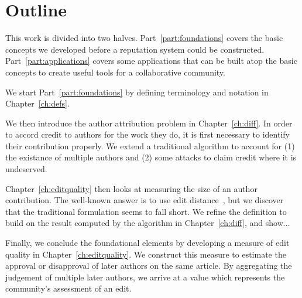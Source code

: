 \section{Outline}

This work is divided into two halves.
Part~\ref{part:foundations} covers the basic concepts we developed
before a reputation system could be constructed.
Part~\ref{part:applications} covers some applications that can
be built atop the basic concepts to create useful tools for
a collaborative community.

We start Part~\ref{part:foundations}
by defining terminology and notation in Chapter~\ref{ch:defs}.

We then introduce the author attribution problem in Chapter~\ref{ch:diff}.
In order to accord credit to authors for the work they do,
it is first necessary to identify their contribution properly.
We extend a traditional  algorithm to
account for (1) the existance of multiple authors and (2) some attacks
to claim credit where it is undeserved.

Chapter~\ref{ch:editquality} then looks at measuring the size of
an author contribution.
The well-known answer is to use edit distance~\cite{Levenshtein66},
but we discover that the traditional formulation seems to fall short.
We refine the definition to build on the result computed by the
algorithm in Chapter~\ref{ch:diff}, and show...

Finally, we conclude the foundational elements by developing a measure
of edit quality in Chapter~\ref{ch:editquality}.
We construct this measure to estimate the approval or disapproval of
later authors on the same article.
By aggregating the judgement of multiple later authors, we arrive at
a value which represents the community's assessment of an edit.

